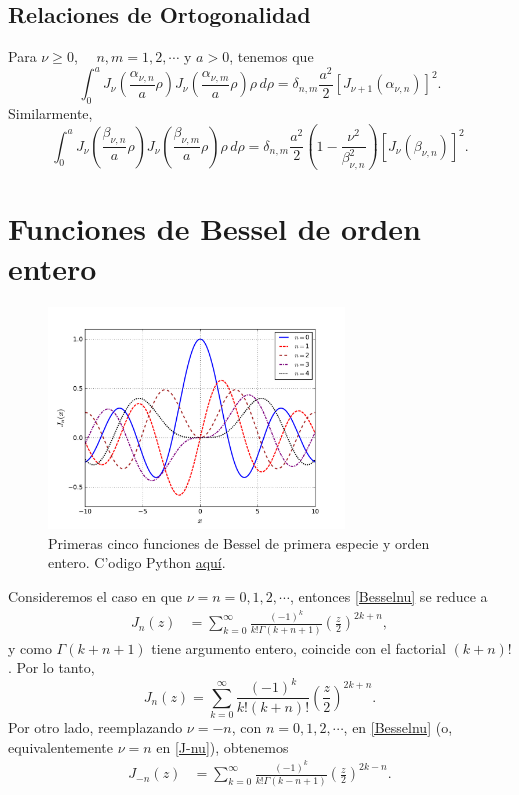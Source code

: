\subsection{Relaciones de Ortogonalidad}
Para $\nu\ge 0$, $\quad n,m=1,2,\cdots$ y $a>0$, tenemos que
\begin{equation}\label{roJnualpha}
\int_0^a J_\nu\left(\frac{\alpha_{\nu,n}}{a}\rho\right)J_\nu\left(\frac{\alpha_{\nu,m}}{a}\rho\right)\rho \, d\rho=\delta_{n,m}\frac{a^2}{2}\left[J_{\nu+1}(\alpha_{\nu,n})\right]^2.
\end{equation}
Similarmente,
\begin{equation}\label{roJnubeta}
\int_0^a J_\nu\left(\frac{\beta_{\nu,n}}{a}\rho\right)J_\nu\left(\frac{\beta_{\nu,m}}{a}\rho\right)\rho \, d\rho=\delta_{n,m}\frac{a^2}{2}\left(1-\frac{\nu^2}{\beta_{\nu,n}^2}\right)\left[J_\nu(\beta_{\nu,n})\right]^2.
\end{equation}

\section{Funciones de Bessel de orden entero}
\begin{figure}[H]
\centering
\includegraphics[angle=0,width=0.7\textwidth]{figs/fig-Bessel-J.pdf}
\caption{Primeras cinco funciones de Bessel de primera especie y orden entero. C'odigo Python \href{https://github.com/gfrubi/FM2/blob/master/figuras-editables/fig-Bessel.py}{aqu\'i}.}
\label{fig-Jn}
\end{figure}
Consideremos el caso en que $\nu=n=0,1,2,\cdots$, entonces \eqref{Besselnu} se reduce a
\begin{align}
J_n(z) &= \sum_{k=0}^\infty \frac{(-1)^k}{k!\Gamma(k+n+ 1)}
\left(\frac{z}{2}\right)^{2k+n},
\end{align}
y como $\Gamma(k+n+ 1)$ tiene argumento entero, coincide con el factorial $(k+n)!$. Por lo tanto,
\begin{equation}
\boxed{J_n(z) =\sum_{k=0}^\infty \frac{(-1)^k}{k!(k+n)!}
\left(\frac{z}{2}\right)^{2k+n}.}
\end{equation}
Por otro lado, reemplazando $\nu=-n$, con $n=0,1,2,\cdots$, en \eqref{Besselnu} (o, equivalentemente $\nu=n$ en \eqref{J-nu}), obtenemos
\begin{align}\label{J-n}
J_{-n}(z) &= \sum_{k=0}^\infty \frac{(-1)^k}{k!\Gamma(k-n+ 1) }
\left(\frac{z}{2}\right)^{2k-n}.
\end{align}

